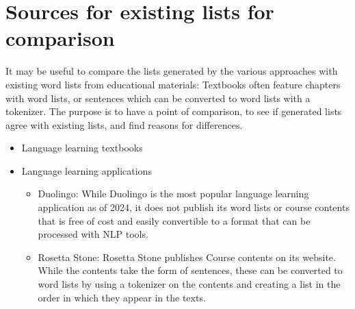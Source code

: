 \section{Sources for existing lists for comparison}
It may be useful to compare the lists generated by the various approaches with existing word lists from educational materials:
Textbooks often feature chapters with word lists, or sentences which can be converted to word lists with a tokenizer.
The purpose is to have a point of comparison, to see if generated lists agree with existing lists, and find reasons for differences.

\begin{itemize}
    \item Language learning textbooks

    \item Language learning applications
    \begin{itemize}
        \item Duolingo: While Duolingo is the most popular language learning application as of 2024, it does not publish its word lists or course contents that is free of cost and easily convertible to a format that can be processed with NLP tools.
        \item Rosetta Stone: Rosetta Stone publishes Course contents on its website. While the contents take the form of sentences, these can be converted to word lists by using a tokenizer on the contents and creating a list in the order in which they appear in the texts.
    \end{itemize}
\end{itemize}


